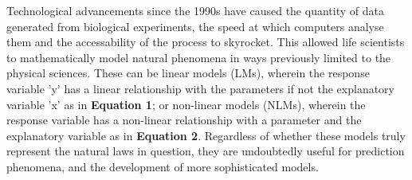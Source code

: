 \documentclass[11pt]{article}
\begin{document}

Technological advancements since the 1990s have caused the quantity of data generated from biological experiments, the speed at which computers analyse them and the accessability of the process to skyrocket. This allowed life scientists to mathematically model natural phenomena in ways previously limited to the physical sciences.\parencite{Bolker2013,Johnson2004} These can be linear models (LMs), wherein the response variable 'y' has a linear relationship with the parameters if not the explanatory variable 'x' as in \textbf{Equation 1}; or non-linear models (NLMs), wherein the response variable has a non-linear relationship with a parameter and the explanatory variable as in \textbf{Equation 2}.\parencite{Bolker2013} Regardless of whether these models truly represent the natural laws in question, they are undoubtedly useful for prediction phenomena, and the development of more sophisticated models.\parencite{Transtrum2016}
\end{document}
